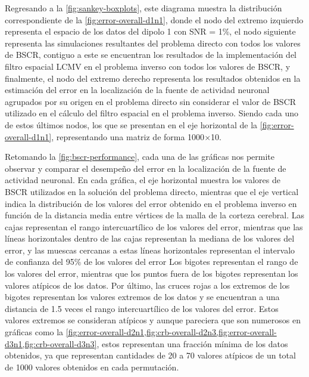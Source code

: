 Regresando a la \cref{fig:sankey-boxplots}, este diagrama muestra la distribución correspondiente de la \cref{fig:error-overall-d1n1}, donde el nodo del extremo izquierdo representa el espacio de los datos del dipolo 1 con SNR = 1\%, el nodo siguiente representa las simulaciones resultantes del problema directo con todos los valores de BSCR, contiguo a este se encuentran los resultados de la implementación del filtro espacial LCMV en el problema inverso con todos los valores de BSCR, y finalmente, el nodo del extremo derecho representa los resultados obtenidos en la estimación del error en la localización de la fuente de actividad neuronal agrupados por su origen en el problema directo sin considerar el valor de BSCR utilizado en el cálculo del filtro espacial en el problema inverso.
Siendo cada uno de estos últimos nodos, los que se presentan en el eje horizontal de la \cref{fig:error-overall-d1n1}, representando una matriz de forma 1000$\times$10. 

Retomando la \cref{fig:bscr-performance}, cada una de las gráficas nos permite observar y comparar el desempeño del error en la localización de la fuente de actividad neuronal.
En cada gráfica, el eje horizontal muestra los valores de BSCR utilizados en la solución del problema directo, mientras que el eje vertical indica la distribución de los valores del error obtenido en el problema inverso en función de la distancia media entre vértices de la malla de la corteza cerebral.
Las cajas representan el rango intercuartílico de los valores del error, mientras que las líneas horizontales dentro de las cajas representan la mediana de los valores del error, y las muescas cercanas a estas líneas horizontales representan el intervalo de confianza del 95\% de los valores del error
Los bigotes representan el rango de los valores del error, mientras que los puntos fuera de los bigotes representan los valores atípicos de los datos.
Por último, las cruces rojas a los extremos de los bigotes representan los valores extremos de los datos y se encuentran a una distancia de 1.5 veces el rango intercuartílico de los valores del error.
Estos valores extremos se consideran atípicos y aunque pareciera que son numerosos en gráficas como la \cref{fig:error-overall-d2n1,fig:crb-overall-d2n3,fig:error-overall-d3n1,fig:crb-overall-d3n3}, estos representan una fracción mínima de los datos obtenidos, ya que representan cantidades de 20 a 70 valores atípicos de un total de 1000 valores obtenidos en cada permutación.

